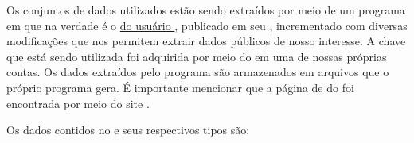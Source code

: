   Os conjuntos de dados utilizados estão sendo extraídos por meio de um programa em  que na verdade é o \href{https://github.com/mitchelljy/Trending-YouTube-Scraper}{ do usuário }, publicado em seu \href{https://github.com/mitchelljy}{}, incrementado com diversas modificações que nos permitem extrair dados públicos de nosso interesse. A chave \href{https://developers.google.com/youtube/v3/docs?hl=pt-br}{} que está sendo utilizada foi adquirida por meio do  em uma de nossas próprias contas. Os dados extraídos pelo programa são armazenados em arquivos  que o próprio programa gera. É importante mencionar que a página de  do  foi encontrada por meio do site \cite{kaggle}.

  Os dados contidos no  e seus respectivos tipos são:

